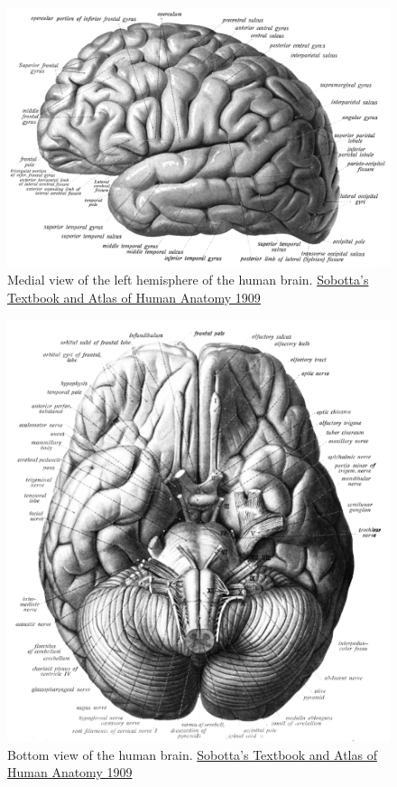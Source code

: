 \begin{figure}

{\centering \includegraphics[width=0.7\linewidth]{./figures/cns/Sobo_1909_626} 

}

\caption{Medial view of the left hemisphere of the human brain. \href{https://commons.wikimedia.org/wiki/File:Sobo_1909_624.png}{Sobotta's Textbook and Atlas of Human Anatomy 1909}}\label{fig:lateralview}
\end{figure}



\begin{figure}

{\centering \includegraphics[width=0.7\linewidth]{./figures/cns/Sobo_1909_623} 

}

\caption{Bottom view of the human brain. \href{https://commons.wikimedia.org/wiki/File:Sobo_1909_623.png}{Sobotta's Textbook and Atlas of Human Anatomy 1909}}\label{fig:bottomview}
\end{figure}

